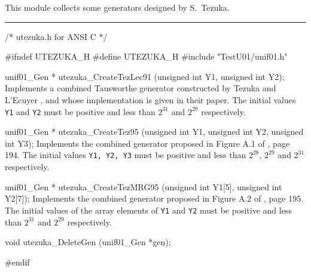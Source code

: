 
This module collects some generators designed by S.~Tezuka.

\bigskip
\hrule
\code
\hide
/* utezuka.h for ANSI C */

#ifndef UTEZUKA_H
#define UTEZUKA_H
\endhide
#include "TestU01/unif01.h"


unif01_Gen * utezuka_CreateTezLec91 (unsigned int Y1, unsigned int Y2);
\endcode
  \tab  Implements a combined Tausworthe generator constructed
   by Tezuka and L'Ecuyer \cite{rTEZ91b}, and whose implementation
   is given in their paper.
%
   The initial values {\tt Y1} and {\tt Y2} must be positive and
   less than $2^{31}$ and $2^{29}$ respectively.
  \endtab
\code


unif01_Gen * utezuka_CreateTez95 (unsigned int Y1, unsigned int Y2,
                                  unsigned int Y3);
\endcode
  \tab  Implements the  combined  generator proposed in
   Figure A.1 of \cite{rTEZ95a}, page 194.
   The initial values {\tt Y1, Y2, Y3} must be positive and
   less than $2^{28}$, $2^{29}$ and $2^{31}$
   respectively.
  \endtab
\code


unif01_Gen * utezuka_CreateTezMRG95 (unsigned int Y1[5],
                                     unsigned int Y2[7]);
\endcode
  \tab  Implements the  combined  generator proposed in
   Figure A.2 of \cite{rTEZ95a}, page 195.
   The initial values of the array elements of {\tt Y1} and {\tt Y2}
   must be positive and
   less than $2^{31}$ and $2^{29}$ respectively.
  \endtab




\code

void utezuka_DeleteGen (unif01_Gen *gen);
\endcode
 \tab \DelGen
 \endtab
\code

\hide
#endif
\endhide
\endcode
